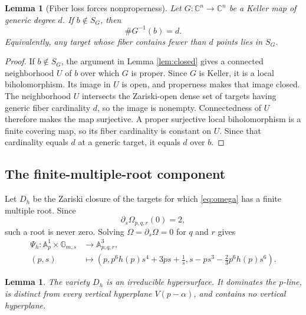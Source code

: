 \documentclass[11pt]{article}
\newtheorem{lemma}[theorem]{Lemma}
\newcommand{\C}{\mathbb{C}}
\newcommand{\A}{\mathbb{A}}
\begin{document}
\begin{lemma}[Fiber loss forces nonproperness]
\label{lem:fiber-loss}
Let $G:\C^n\to\C^n$ be a Keller map of generic degree $d$.  If
$b\notin S_G$, then
\[
 \#G^{-1}(b)=d.
\]
Equivalently, any target whose fiber contains fewer than $d$ points lies in
$S_G$.
\end{lemma}

\begin{proof}
If $b\notin S_G$, the argument in Lemma \ref{lem:closed} gives a connected
neighborhood $U$ of $b$ over which $G$ is proper.  Since $G$ is Keller, it is
a local biholomorphism.  Its image in $U$ is open, and properness makes that
image closed.  The neighborhood $U$ intersects the Zariski-open dense set of
targets having generic fiber cardinality $d$, so the image is nonempty.
Connectedness of $U$ therefore makes the map surjective.  A proper surjective
local biholomorphism is a finite covering map, so its fiber cardinality is
constant on $U$.  Since that cardinality equals $d$ at a generic target, it
equals $d$ over $b$.
\end{proof}

\subsection{The finite-multiple-root component}

Let $D_h$ be the Zariski closure of the targets for which
\eqref{eq:omega} has a finite multiple root.  Since
\[
 \partial_s\Omega_{p,q,r}(0)=2,
\]
such a root is never zero.  Solving $\Omega=\partial_s\Omega=0$ for $q$ and
$r$ gives
\begin{equation}
 \boxed{
 \begin{aligned}
 \Psi_h:\A^1_p\times\mathbb{G}_{m,s}&\longrightarrow\A^3_{p,q,r},\\
 (p,s)&\longmapsto
 \left(
 p,
 p^6h(p)s^4+3ps+\frac1s,
 s-ps^3-\frac23p^6h(p)s^6
 \right).
 \end{aligned}}
 \label{eq:parametrization}
\end{equation}

\begin{lemma}
\label{lem:irreducible}
The variety $D_h$ is an irreducible hypersurface.  It dominates the $p$-line,
is distinct from every vertical hyperplane $V(p-\alpha)$, and contains no
vertical hyperplane.
\end{lemma}
\end{document}
